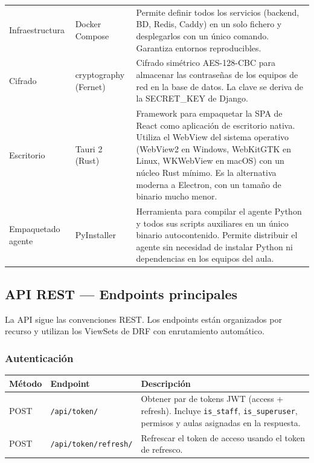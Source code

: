 \documentclass[12pt, a4paper, twoside]{article}
\begin{document}
\begin{longtable}{llp{7cm}}
  \addlinespace
  Infraestructura & Docker Compose & Permite definir todos los servicios (backend, BD, Redis, Caddy) en un solo fichero y desplegarlos con un único comando. Garantiza entornos reproducibles. \\
  \addlinespace
  Cifrado & cryptography (Fernet) & Cifrado simétrico AES-128-CBC para almacenar las contraseñas de los equipos de red en la base de datos. La clave se deriva de la SECRET\_KEY de Django. \\
  \addlinespace
  Escritorio & Tauri 2 (Rust) & Framework para empaquetar la SPA de React como aplicación de escritorio nativa. Utiliza el WebView del sistema operativo (WebView2 en Windows, WebKitGTK en Linux, WKWebView en macOS) con un núcleo Rust mínimo. Es la alternativa moderna a Electron, con un tamaño de binario mucho menor. \\
  \addlinespace
  Empaquetado agente & PyInstaller & Herramienta para compilar el agente Python y todos sus scripts auxiliares en un único binario autocontenido. Permite distribuir el agente sin necesidad de instalar Python ni dependencias en los equipos del aula. \\
  \bottomrule
\end{longtable}

\subsection{API REST — Endpoints principales}

La API sigue las convenciones REST. Los endpoints están organizados por recurso y utilizan los ViewSets de DRF con enrutamiento automático.

\subsubsection{Autenticación}

\begin{longtable}{llp{6cm}}
  \toprule
  \textbf{Método} & \textbf{Endpoint} & \textbf{Descripción} \\
  \midrule
  POST & \texttt{/api/token/} & Obtener par de tokens JWT (access + refresh). Incluye \texttt{is\_staff}, \texttt{is\_superuser}, permisos y aulas asignadas en la respuesta. \\
  POST & \texttt{/api/token/refresh/} & Refrescar el token de acceso usando el token de refresco. \\
  \bottomrule
\end{longtable}
\end{document}
